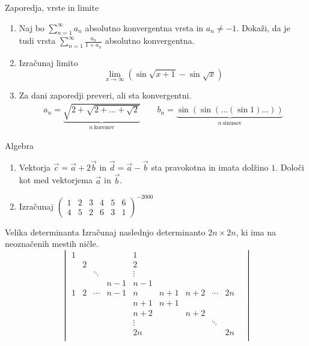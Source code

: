 \begin{frame}{Zaporedja, vrste in limite}
	\begin{enumerate}
		\item 
		Naj bo $\sum_{n=1}^{\infty} a_n$ absolutno konvergentna vrsta in $a_n \ne -1$.
		Dokaži, da je tudi vrsta $\sum_{n=1}^\infty \frac{a_n}{1+a_n}$
		absolutno konvergentna.

		\item
		Izračunaj limito
		$$\lim_{x\rightarrow \infty} (\sin \sqrt{x+1}-\sin \sqrt{x})$$

		\item
		Za dani zaporedji preveri, ali sta konvergentni.
		\begin{align*}
			 a_n = \underbrace{\sqrt{2+\sqrt{2+\dots+\sqrt{2}}}}_{n~\text{korenov}} \qquad
			 b_n = \underbrace{\sin(\sin(\dots(\sin 1)\dots))}_{n~\text{sinusov}}
		\end{align*}
	\end{enumerate}
\end{frame}

\begin{frame}{Algebra}
	\begin{enumerate}
		\item
		Vektorja $\vec{c} =\vec{a}+ 2 \vec{b} $ in $\vec{d} =\vec{a}- \vec{b} $
		sta pravokotna in imata dolžino $1$. Določi kot med vektorjema $\vec{a}$ in $\vec{b}$.
		\item 
		Izračunaj
		$\begin{pmatrix}
			1 & 2 & 3 & 4 & 5 & 6\\
			4 & 5 & 2 & 6 & 3 & 1
			\end{pmatrix}^{-2000}	
			$
	\end{enumerate}
\end{frame}

\begin{frame}{Velika determinanta}
	Izračunaj naslednjo determinanto $2n \times 2n$, ki ima na neoznačenih mestih ničle.
	$$\begin{vmatrix}
		1 & & & & 1 & & & & \\
		& 2 & & & 2 & & & & \\
		& &\ddots & & \vdots & & & & &\\
		& & & n-1 & n-1 & & & & \\
		1 & 2 & \cdots & n-1 & n & n+1 & n+2 & \cdots & 2n\\
		& & & & n+1 & n+1 & & & \\
		& & & & n+2 & & n+2 & & \\
		& & & & \vdots & & & \ddots & \\
		& & & & 2n & & & & 2n\\
		\end{vmatrix}$$
\end{frame}

